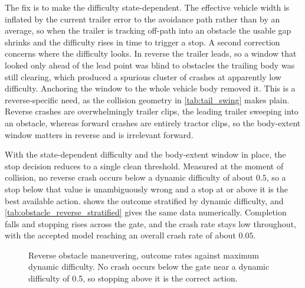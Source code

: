 The fix is to make the difficulty state-dependent. The effective vehicle width is inflated by the current trailer error to the avoidance path rather than by an average, so when the trailer is tracking off-path into an obstacle the usable gap shrinks and the difficulty rises in time to trigger a stop. A second correction concerns where the difficulty looks. In reverse the trailer leads, so a window that looked only ahead of the lead point was blind to obstacles the trailing body was still clearing, which produced a spurious cluster of crashes at apparently low difficulty. Anchoring the window to the whole vehicle body removed it. This is a reverse-specific need, as the collision geometry in \cref{tab:tail_swing} makes plain. Reverse crashes are overwhelmingly trailer clips, the leading trailer sweeping into an obstacle, whereas forward crashes are entirely tractor clips, so the body-extent window matters in reverse and is irrelevant forward.



With the state-dependent difficulty and the body-extent window in place, the stop decision reduces to a single clean threshold. Measured at the moment of collision, no reverse crash occurs below a dynamic difficulty of about $0.5$, so a stop below that value is unambiguously wrong and a stop at or above it is the best available action.  shows the outcome stratified by dynamic difficulty, and \cref{tab:obstacle_reverse_stratified} gives the same data numerically. Completion falls and stopping rises across the gate, and the crash rate stays low throughout, with the accepted model reaching an overall crash rate of about $0.05$.

\begin{figure}[H]
    \centering
    \caption{Reverse obstacle maneuvering, outcome rates against maximum dynamic difficulty. No crash occurs below the gate near a dynamic difficulty of 0.5, so stopping above it is the correct action.}
    \label{fig:reverse_obstacle_gate}
\end{figure}



